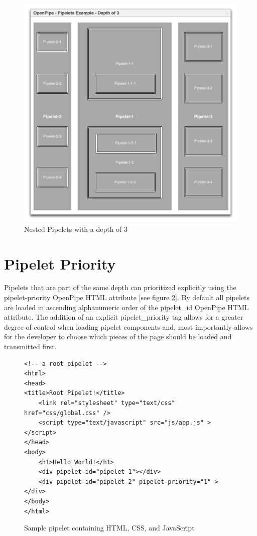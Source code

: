 \documentclass[12pt]{report}
\begin{document}
\begin{figure}[H]
\label{fig:nestedPipelets}
\centering
\includegraphics[width=\textwidth,keepaspectratio]{figures/images/nested_pipelets.pdf}
\caption{Nested Pipelets with a depth of 3}
\end{figure}

\section{Pipelet Priority}

Pipelets that are part of the same depth can prioritized explicitly using the pipelet-priority OpenPipe HTML attribute [see figure \ref{fig:pipeletPriority}]. By default all pipelets are loaded in ascending alphanumeric order of the pipelet\_id OpenPipe HTML attribute. The addition of an explicit pipelet\_priority tag allows for a greater degree of control when loading pipelet components and, most importantly allows for the developer to choose which pieces of the page should be loaded and transmitted first.

\begin{figure}[H]
\label{fig:pipeletPriority}
\begin{lstlisting}
<!-- a root pipelet -->
<html>
<head>
<title>Root Pipelet!</title>
	<link rel="stylesheet" type="text/css" href="css/global.css" />
	<script type="text/javascript" src="js/app.js" ></script>
</head>
<body>
	<h1>Hello World!</h1>
	<div pipelet-id="pipelet-1"></div>
	<div pipelet-id="pipelet-2" pipelet-priority="1" ></div>
</body>
</html>
\end{lstlisting}
\caption{Sample pipelet containing HTML, CSS, and JavaScript}
\end{figure}
\end{document}
